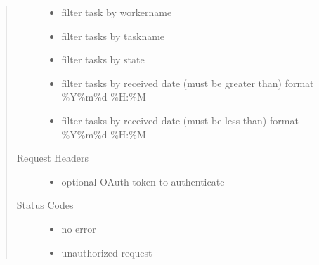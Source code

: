\documentclass[letterpaper,10pt,english]{sphinxmanual}
\begin{document}
\begin{fulllineitems}
\begin{quote}
\begin{description}
\begin{itemize}
\item {} 
 \textendash{} filter task by workername

\item {} 
 \textendash{} filter tasks by taskname

\item {} 
 \textendash{} filter tasks by state

\item {} 
 \textendash{} filter tasks by received date (must be greater than) format \%Y\sphinxhyphen{}\%m\sphinxhyphen{}\%d \%H:\%M

\item {} 
 \textendash{} filter tasks by received date (must be less than) format \%Y\sphinxhyphen{}\%m\sphinxhyphen{}\%d \%H:\%M

\end{itemize}

\item[{Request Headers}] \leavevmode\begin{itemize}
\item {} 
 \textendash{} optional OAuth token to authenticate

\end{itemize}

\item[{Status Codes}] \leavevmode\begin{itemize}
\item {} 
 \textendash{} no error

\item {} 
 \textendash{} unauthorized request

\end{itemize}

\end{description}\end{quote}

\end{fulllineitems}
\end{document}
